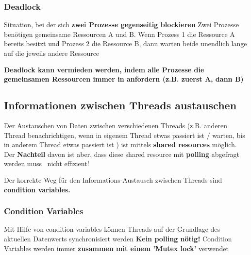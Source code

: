 \subsubsection{Deadlock}

\begin{outline}
    \1 Situation, bei der sich \textbf{zwei Prozesse gegenseitig blockieren}
        \2 Zwei Prozesse benötigen gemeinsame Ressourcen A und B. Wenn Prozess 1 die Ressource A bereits besitzt und Prozess 2 die Ressource B,
            dann warten beide unendlich lange auf die jeweils andere Ressource
\end{outline}

\vspace{0.1cm}

\textbf{Deadlock kann vermieden werden, indem alle Prozesse die gemeinsamen Ressourcen immer in
 anfordern (z.B. zuerst A, dann B)}


\subsection{Informationen zwischen Threads austauschen}

Der Austauschen von Daten zwischen verschiedenen Threads (z.B. anderen Thread benachrichtigen, wenn in eigenem Thread etwas passiert ist / warten,
bis in anderem Thread etwas passiert ist ) ist mittels \textbf{shared resources} möglich. \\
Der \textbf{Nachteil} davon ist aber, dass diese shared resource mit \textbf{polling} abgefragt werden muss \textrightarrow\ nicht effizient!

\vspace{0.1cm}

Der korrekte Weg für den Informations-Austausch zwischen Threads sind \textbf{condition variables.}


\subsubsection{Condition Variables}

\begin{outline}
    \1 Mit Hilfe von condition variables können Threads auf der Grundlage des aktuellen Datenwerts synchronisiert werden
        \2 \textbf{Kein polling nötig!}
    \1 Condition Variables werden immer \textbf{zusammen mit einem 'Mutex lock'} verwendet
\end{outline}



